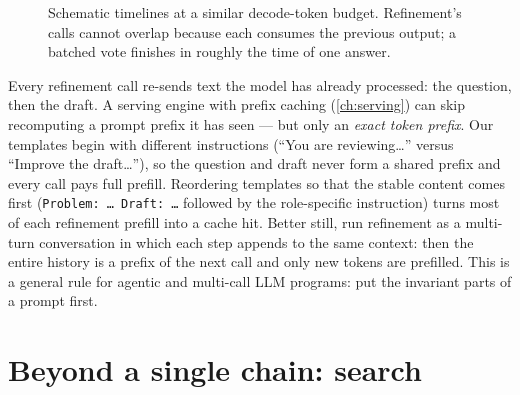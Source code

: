 \begin{figure}[t]
\centering
{}
\caption{Schematic timelines at a similar decode-token budget. Refinement's calls cannot overlap
because each consumes the previous output; a batched vote finishes in roughly the time of one
answer.}
\label{fig:refine:timeline}
\end{figure}

\begin{systemslens}
Every refinement call re-sends text the model has already processed: the question, then the draft.
A serving engine with prefix caching (\cref{ch:serving}) can skip recomputing a prompt prefix it has
seen --- but only an \emph{exact token prefix}. Our templates begin with different instructions
(``You are reviewing\dots'' versus ``Improve the draft\dots''), so the question and draft never form a
shared prefix and every call pays full prefill. Reordering templates so that the stable content comes
first (\texttt{Problem: \dots\ Draft: \dots} followed by the role-specific instruction) turns most of
each refinement prefill into a cache hit. Better still, run refinement as a multi-turn conversation
in which each step appends to the same context: then the entire history is a prefix of the next call
and only new tokens are prefilled. This is a general rule for agentic and multi-call LLM programs:
put the invariant parts of a prompt first.
\end{systemslens}

\section{Beyond a single chain: search}\label{sec:refine:search}

